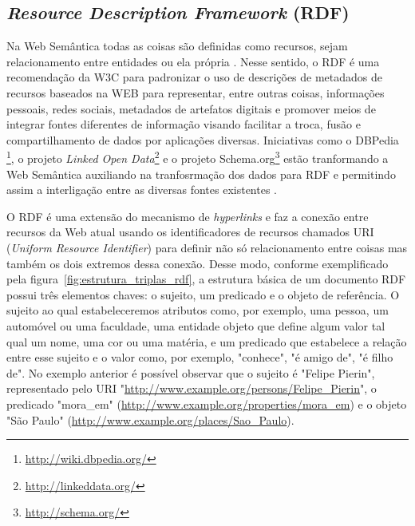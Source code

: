 
\subsection{\emph{Resource Description Framework} (RDF)}
\label{sec:rdf}

Na Web Semântica todas as coisas são definidas como recursos, sejam relacionamento entre entidades ou ela própria \citep {Allemang2011}. Nesse sentido, o RDF é uma recomendação da W3C para padronizar o uso de descrições de metadados de recursos baseados na WEB \citep{VanDeursen2008} para representar, entre outras coisas, informações pessoais, redes sociais, metadados de artefatos digitais e promover meios de integrar fontes diferentes de informação visando facilitar a troca, fusão e compartilhamento de dados por aplicações diversas. Iniciativas como o DBPedia \footnote{\url{http://wiki.dbpedia.org/}}, o projeto \emph{Linked Open Data}\footnote{\url{http://linkeddata.org/}} e o projeto Schema.org\footnote{\url{http://schema.org/}} estão tranformando a Web Semântica auxiliando na tranfosrmação dos dados para RDF e permitindo assim a interligação entre as diversas fontes existentes \citep{Heath2008}.

O RDF é uma extensão do mecanismo de \emph{hyperlinks} e faz a conexão entre recursos da Web atual usando os identificadores de recursos chamados URI (\emph{Uniform Resource Identifier}) para definir não só relacionamento entre coisas mas também os dois extremos dessa conexão. Desse modo, conforme exemplificado pela figura~\ref{fig:estrutura_triplas_rdf}, a estrutura básica de um documento RDF possui três elementos chaves: o sujeito, um predicado e o objeto de referência. O sujeito ao qual estabeleceremos atributos como, por exemplo, uma pessoa, um automóvel ou uma faculdade, uma entidade objeto que define algum valor tal qual um nome, uma cor ou uma matéria, e um predicado que estabelece a relação entre esse sujeito e o valor como, por exemplo, "conhece", "é amigo de", "é filho de". No exemplo anterior é possível observar que o sujeito é "Felipe Pierin", representado pelo URI "\url{http://www.example.org/persons/Felipe_Pierin}", o predicado "mora\_em" (\url{http://www.example.org/properties/mora_em}) e o objeto "São Paulo" (\url{http://www.example.org/places/Sao_Paulo}).

